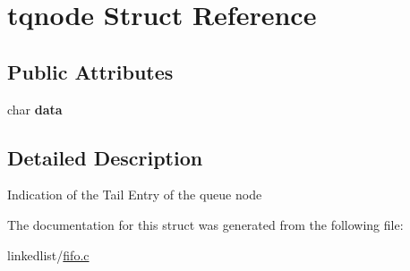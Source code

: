 \hypertarget{structtqnode}{}\section{tqnode Struct Reference}
\label{structtqnode}
\subsection*{Public Attributes}
\begin{DoxyCompactItemize}
\item 
\mbox{\label{structtqnode_a73f44cc45414f814528b4ad41e9d6e98}} 
char {\bfseries data}
\end{DoxyCompactItemize}


\subsection{Detailed Description}
Indication of the Tail Entry of the queue node 

The documentation for this struct was generated from the following file\+:\begin{DoxyCompactItemize}
\item 
linkedlist/\hyperlink{fifo_8c}{fifo.\+c}\end{DoxyCompactItemize}
